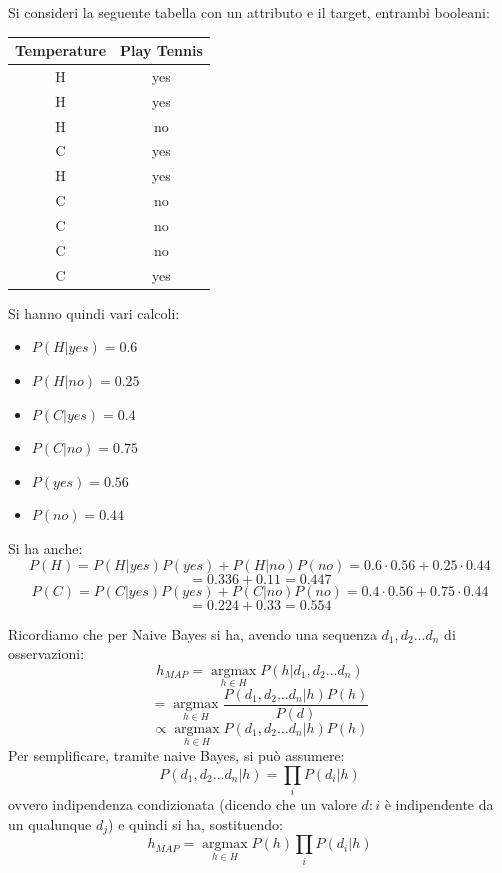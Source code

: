 \begin{esercizio}
  Si consideri la seguente tabella con un attributo e il target, entrambi
  booleani:
  \begin{table}[H]
    \centering
    \begin{tabular}{c||c}
      Temperature & Play Tennis\\
      \hline
      \hline
      H & yes\\
      H & yes\\
      H & no\\
      C & yes\\
      H & yes\\
      C & no\\
      C & no\\
      C & no\\
      C & yes\\
    \end{tabular}
  \end{table}
  Si hanno quindi vari calcoli:
  \begin{itemize}
    \item $P(H|yes)=0.6$
    \item $P(H|no)=0.25$
    \item $P(C|yes)=0.4$
    \item $P(C|no)=0.75$
    \item $P(yes)=0.56$
    \item $P(no)=0.44$
  \end{itemize}
  Si ha anche:
  \[P(H)=P(H|yes)P(yes)+P(H|no)P(no)=0.6\cdot 0.56+0.25\cdot 0.44 \]
  \[= 0.336+0.11=0.447\]
  \[P(C)=P(C|yes)P(yes)+P(C|no)P(no)=0.4\cdot 0.56+0.75\cdot 0.44 \]
  \[= 0.224+0.33=0.554\]
\end{esercizio}
Ricordiamo che per Naive Bayes si ha, avendo una sequenza $d_1, d_2\ldots d_n$ di
osservazioni: 
\[h_{MAP}=\operatorname*{argmax}_{h\in H}P(h|d_1, d_2\ldots d_n)\]
\[=\operatorname*{argmax}_{h\in H}\frac{P(d_1, d_2\ldots d_n|h)P(h)}{P(d)}\]
\[\varpropto\operatorname*{argmax}_{h\in H}P(d_1, d_2\ldots d_n|h)P(h)\]
Per semplificare, tramite naive Bayes, si può assumere:
\[P(d_1, d_2\ldots d_n|h)=\prod_iP(d_i|h)\]
ovvero indipendenza condizionata (dicendo che un valore $d:i$ è indipendente da
un qualunque $d_j$) e quindi si ha, sostituendo:
\[h_{MAP}=\operatorname*{argmax}_{h\in H}P(h)\prod_iP(d_i|h)\]
\newpage
